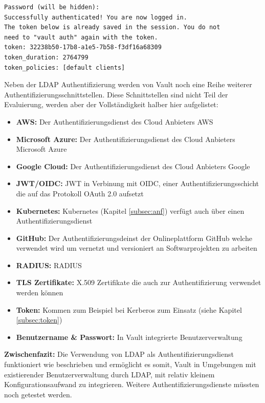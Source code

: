 \documentclass[
book,
a4paper,   
titlepage,  
halfparskip,
12pt        
]{scrartcl}
\begin{document}
\begin{onehalfspacing}
\begin{lstlisting}[caption={[\acs{LDAP} Authentifizierung] Kommandozeilenausgabe nach erfolgreicher Authentifizierung durch \acs{LDAP}}, label=lst:auth, captionpos=b, basicstyle=\ttfamily] 
Password (will be hidden):
Successfully authenticated! You are now logged in.
The token below is already saved in the session. You do not
need to "vault auth" again with the token.
token: 32238b50-17b8-a1e5-7b58-f3df16a68309
token_duration: 2764799
token_policies: [default clients]
\end{lstlisting}

Neben der LDAP Authentifizierung werden von Vault noch eine Reihe weiterer Authentifizierungsschnittstellen. Diese Schnittstellen sind nicht Teil der Evaluierung, werden aber der Vollständigkeit halber hier aufgelistet:\cite{vaultauth}
\begin{itemize}
	\item \textbf{\ac{AWS}:} Der Authentifizierungsdienst des Cloud Anbieters \ac{AWS}
	\item \textbf{Microsoft Azure:} Der Authentifizierungsdienst des Cloud Anbieters Microsoft Azure
	\item \textbf{Google Cloud:} Der Authentifizierungsdienst des Cloud Anbieters Google
	\item \textbf{\acs{JWT}/\acs{OIDC}:} \ac{JWT} in Verbinung mit \ac{OIDC}, einer Authentifizierungsschicht die auf das Protokoll OAuth 2.0 aufsetzt
	\item \textbf{Kubernetes:} Kubernetes (Kapitel \vref{subsec:anf}) verfügt auch über einen Authentifizierungsdienst
	\item \textbf{GitHub:} Der Authentifizierungsdeinst der Onlineplattform GitHub welche verwendet wird um vernetzt und versioniert an Softwarprojekten zu arbeiten
	\item \textbf{\acs{RADIUS}:} \ac{RADIUS} 
	\item \textbf{\acs{TLS} Zertifikate:} X.509 Zertifikate die auch zur Authentifizierung verwendet werden können
	\item \textbf{Token:} Kommen zum Beispiel bei Kerberos zum Einsatz (siehe Kapitel \vref{subsec:token})
	\item \textbf{Benutzername \& Passwort:} In Vault integrierte Benutzerverwaltung
\end{itemize}

\textbf{Zwischenfazit:} Die Verwendung von LDAP als Authentifizierungsdienst funktioniert wie beschrieben und ermöglicht es somit, Vault in Umgebungen mit existierender Benutzerverwaltung durch LDAP, mit relativ kleinem Konfigurationsaufwand zu integrieren. Weitere Authentifizierungsdienste müssten noch getestet werden.


\end{onehalfspacing}
\end{document}
